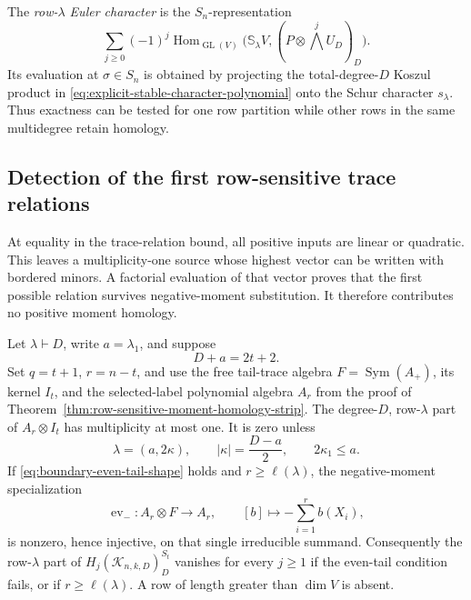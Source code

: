 The \emph{row-$\lambda$ Euler character} is the
$S_n$-representation
\[
 \sum_{j\ge0}(-1)^j
 \operatorname{Hom}_{\operatorname{GL}(V)}
       \bigl(\mathbb S_\lambda V,
              (P\otimes\bigwedge^jU_D)_D\bigr).
\]
Its evaluation at $\sigma\in S_n$ is obtained by projecting the
total-degree-$D$ Koszul product in
\eqref{eq:explicit-stable-character-polynomial} onto the Schur
character $s_\lambda$.  Thus exactness can be tested for one row
partition while other rows in the same multidegree retain homology.



\subsection{Detection of the first row-sensitive trace relations}

At equality in the trace-relation bound, all positive inputs are
linear or quadratic.  This leaves a multiplicity-one source whose
highest vector can be written with bordered minors.  A factorial
evaluation of that vector proves that the first possible relation
survives negative-moment substitution.  It therefore contributes
no positive moment homology.

\begin{lemma}
\label{lem:boundary-trace-detection}
Let $\lambda\vdash D$, write $a=\lambda_1$, and suppose
\begin{equation}\label{eq:boundary-trace-equality}
                         D+a=2t+2.
\end{equation}
Set $q=t+1$, $r=n-t$, and use the free tail-trace algebra
$F=\operatorname{Sym}(A_+)$, its kernel $I_t$, and the selected-label
polynomial algebra $A_r$ from the proof of
Theorem~\ref{thm:row-sensitive-moment-homology-strip}.
The degree-$D$, row-$\lambda$ part of $A_r\otimes I_t$ has
multiplicity at most one.  It is zero unless
\begin{equation}\label{eq:boundary-even-tail-shape}
       \lambda=(a,2\kappa),\qquad
       |\kappa|=\frac{D-a}{2},\qquad 2\kappa_1\le a.
\end{equation}
If \eqref{eq:boundary-even-tail-shape} holds and
$r\ge\ell(\lambda)$, the negative-moment specialization
\[
 \operatorname{ev}_{-}:A_r\otimes F\longrightarrow A_r,
 \qquad [b]\longmapsto-\sum_{i=1}^r b(X_i),
\]
is nonzero, hence injective, on that single irreducible summand.
Consequently the row-$\lambda$ part of
$H_j(\mathcal K_{n,k,D})^{S_t}_D$ vanishes for every $j\ge1$
if the even-tail condition fails, or if $r\ge\ell(\lambda)$.
A row of length greater than $\dim V$ is absent.
\end{lemma}

